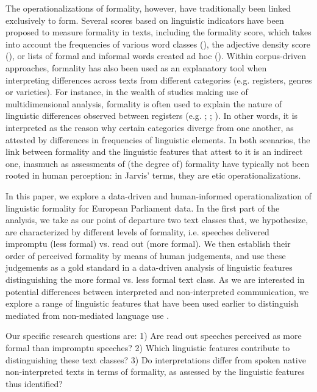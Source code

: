\documentclass[output=paper]{langscibook}
\begin{document}
The operationalizations of formality, however, have traditionally been linked exclusively to form. Several scores based on linguistic indicators have been proposed to measure formality in texts, including the formality score, which takes into account the frequencies of various word classes (\citealt{HeylighenDewaele2002}), the adjective density score (\citealt{FangCao2009}), or lists of formal and informal words created ad hoc (\citealt{AbuSheikhaInkpen2010}). Within corpus-driven approaches, formality has also been used as an explanatory tool when interpreting differences across texts from different categories (e.g. registers, genres or varieties). For instance, in the wealth of studies making use of multidimensional analysis, formality is often used to explain the nature of linguistic differences observed between registers (e.g. \citealt{Biber1988}; \citealt{ConradBiber2001}; \citealt{Biber2012}). In other words, it is interpreted as the reason why certain categories diverge from one another, as attested by differences in frequencies of linguistic elements. In both scenarios, the link between formality and the linguistic features that attest to it is an indirect one, inasmuch as assessments of (the degree of) formality have typically not been rooted in human perception: in Jarvis’ terms, they are etic operationalizations. 

In this paper, we explore a data-driven and human-informed operationalization of linguistic formality for European Parliament data. In the first part of the analysis, we take as our point of departure two text classes that, we hypothesize, are characterized by different levels of formality, i.e. speeches delivered impromptu (less formal) vs. read out (more formal). We then establish their order of perceived formality by means of human judgements, and use these judgements as a gold standard in a data-driven analysis of linguistic features distinguishing the more formal vs. less formal text class. As we are interested in potential differences between interpreted and non-interpreted communication, we explore a range of linguistic features that have been used earlier to distinguish mediated from non-mediated language use \citep{VolanskyEtAl2015}. 

Our specific research questions are: 1) Are read out speeches perceived as more formal than impromptu speeches? 2) Which linguistic features contribute to distinguishing these text classes? 3) Do interpretations differ from spoken native non-interpreted texts in terms of formality, as assessed by the linguistic features thus identified?
\end{document}
